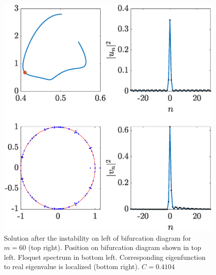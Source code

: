 \documentclass{article}
\begin{document}
\begin{figure}[H]
    \centering
    \includegraphics[width=12cm]{leftafterinstabilityL}
    \caption{Solution after the instability on left of bifurcation diagram for $m=60$ (top right). Position on bifurcation diagram shown in top left. Floquet spectrum in bottom left. Corresponding eigenfunction to real eigenvalue is localized (bottom right). $C = 0.4104$}
    \label{fig:leftinstabL}
\end{figure}
\end{document}
